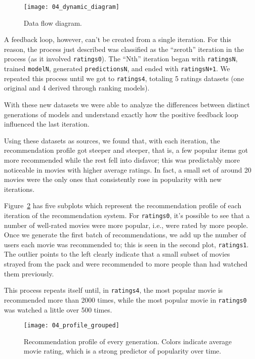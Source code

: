 \begin{figure}
  \centering
  \texttt{[image: 04\_dynamic\_diagram]}
  \caption{Data flow diagram.\label{fig:fig04_dynamic_diagram}}
\end{figure}

A feedback loop, however, can't be created from a single iteration. For this
reason, the process just described was classified as the ``zeroth'' iteration in
the process (as it involved \verb|ratings0|). The ``Nth'' iteration began with
\verb|ratingsN|, trained \verb|modelN|, generated \verb|predictionsN|, and ended
with \verb|ratingsN+1|. We repeated this process until we got to
\verb|ratings4|, totaling 5 ratings datasets (one original and 4 derived through
ranking models).

With these new datasets we were able to analyze the differences between distinct
generations of models and understand exactly how the positive feedback loop
influenced the last iteration.

Using these datasets as sources, we found that, with each iteration, the
recommendation profile got steeper and steeper, that is, a few popular items got
more recommended while the rest fell into disfavor; this was predictably more
noticeable in movies with higher average ratings. In fact, a small set of around
20 movies were the only ones that consistently rose in popularity with new
iterations.

Figure~\ref{fig:fig04_profile_grouped} has five subplots which represent the
recommendation profile of each iteration of the recommendation system. For
\verb|ratings0|, it's possible to see that a number of well-rated movies were
more popular, i.e., were rated by more people. Once we generate the first batch
of recommendations, we add up the number of users each movie was recommended to;
this is seen in the second plot, \verb|ratings1|. The outlier points to the left
clearly indicate that a small subset of movies strayed from the pack and were
recommended to more people than had watched them previously.

This process repeats itself until, in \verb|ratings4|, the most popular movie is
recommended more than 2000 times, while the most popular movie in
\verb|ratings0| was watched a little over 500 times.

\begin{figure}
  \centering
  \texttt{[image: 04\_profile\_grouped]}
  \caption{Recommendation profile of every generation. Colors indicate average
  movie rating, which is a strong predictor of popularity over time.
  \label{fig:fig04_profile_grouped}}
\end{figure}

